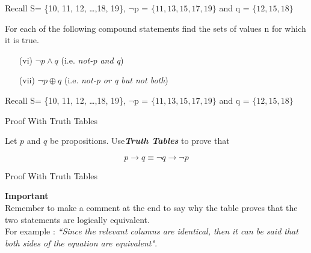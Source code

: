 \documentclass{beamer}
\begin{document}
\begin{frame}
Recall S= \{10, 11, 12, \ldots ,18, 19\}, $\neg$p = $\{ 11, 13, 15, 17, 19\}$  and q = $\{12,15,18\}$

For each of the following compound statements find the sets of values n for which it is true. 
\begin{itemize}
\item[(vi)] $\neg p \wedge q$ (i.e. \textit{not-p and q}) %
\item[(vii)] $ \neg p \oplus q$ (i.e. \textit{ not-p or q but not both}) %
\end{itemize}

Recall S= \{10, 11, 12, \ldots ,18, 19\}, $\neg$p = $\{ 11, 13, 15, 17, 19\}$  and q = $\{12,15,18\}$


{Proof With Truth Tables}

Let $p$ and $q$ be propositions. Use\textbf{\textit{Truth Tables}} to prove that

\[ p \rightarrow q \equiv \neg q \rightarrow \neg p\]
\end{frame}
\begin{frame}
{Proof With Truth Tables}

\textbf{Important}\\ 
Remember to make a comment at the end to say why the table proves that the two statements are logically equivalent. \\ For example : \emph{``Since the relevant columns are identical, then it can be said that both sides of the equation are equivalent"}.
\end{frame}
\end{document}

